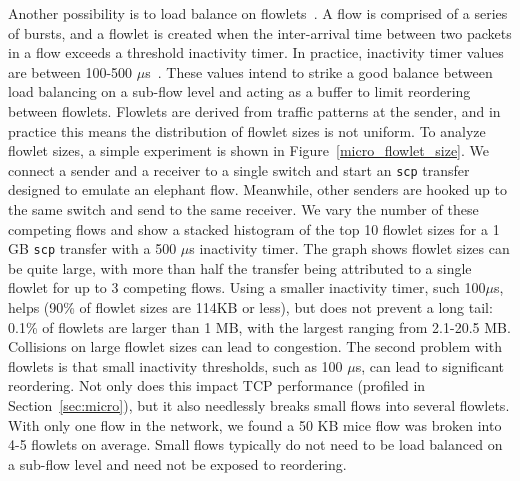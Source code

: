 %


Another possibility is to load balance on flowlets~\cite{conga,juniper-vcf}.  
A flow is comprised of a series of bursts, and a flowlet is created when
the inter-arrival time between two packets in a flow exceeds a threshold inactivity timer.  
In practice, inactivity timer values are between 100-500 $\mu$s~\cite{conga}. 
These values intend to strike a good balance between load balancing on a sub-flow level 
and acting as a buffer to limit reordering between flowlets.
Flowlets are derived from traffic patterns at the sender, and in practice this
means the distribution of flowlet sizes is not uniform. To analyze flowlet sizes, a simple experiment is shown in Figure~\ref{micro_flowlet_size}. 
We connect a sender and a receiver to a single switch and start an {\tt scp} transfer designed to 
emulate an elephant flow. Meanwhile, other senders are hooked up to the same switch and
send to the same receiver. We vary the number of these competing flows and show a stacked histogram of 
the top 10 flowlet sizes for a 1 GB {\tt scp} transfer with a 500 $\mu$s inactivity timer. 
The graph shows flowlet sizes can be quite large, with more than half the transfer being attributed
to a single flowlet for up to 3 competing flows. Using a smaller inactivity timer, such 100$\mu$s, helps (90\% of flowlet sizes are 114KB or less), but
does not prevent a long tail: 0.1\% of flowlets are larger than 1 MB, with the largest ranging from 2.1-20.5 MB.
Collisions on large flowlet sizes can lead to congestion.
The second problem with flowlets is that small inactivity thresholds, such as 100 $\mu$s, can lead to significant reordering.
Not only does this impact TCP performance (profiled in Section~\ref{sec:micro}), but it also needlessly 
breaks small flows into several flowlets. With only one flow in the network, we found a 50 KB
mice flow was broken into 4-5 flowlets on average. Small flows typically do not need to be
load balanced on a sub-flow level and need not be exposed to reordering.


